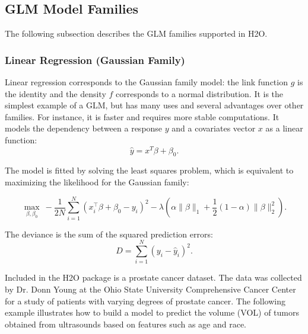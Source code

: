 
\subsection{GLM Model Families}
The following subsection describes the GLM families supported in H2O. 

\subsubsection{Linear Regression (Gaussian Family)}
Linear regression corresponds to the Gaussian family model: the link function $g$ is the identity and the density $f$ corresponds to a normal distribution. It is the simplest example of a GLM, but has many uses and
several advantages over other families. For instance, it is faster and requires more stable computations. It models the dependency between a response $y$ and a covariates vector $x$ as a linear function:
$$ \hat{y} = x^T\beta + \beta_0.$$

The model is fitted by solving the least squares problem, which is equivalent to maximizing the likelihood for the Gaussian family:

$$ \max_{\beta,\beta_0} \ - \frac{1}{2N} \sum_{i=1}^N  (x_i^{\top}\beta + \beta_0 - y_i)^2  - \lambda \left(  \alpha \|\beta \|_1 +  \frac{1}{2} (1- \alpha) \| \beta \|_2^2 \right).$$

The deviance is the sum of the squared prediction errors: 
$$ D = \sum_{i=1}^{N} (y_i - \hat{y}_i)^2 . $$

\newpage
\waterExampleInR

Included in the H2O package is a prostate cancer dataset. The data was collected by Dr. Donn Young at the Ohio State
University Comprehensive Cancer Center for a study of patients with varying degrees of prostate cancer. The
following example illustrates how to build a model to predict the volume (VOL) of tumors obtained from ultrasounds
based on features such as age and race.
\bigskip


\waterExampleInPython


